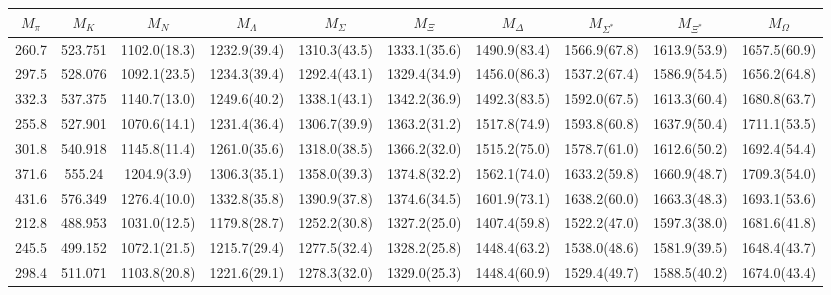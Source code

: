 \documentclass[10pt,a4paper]{article}
\begin{document}
		
			
			\begin{table}[h!]\small
				\begin{tabular}{cccccccccc}
					$M_{\pi}$ & $M_K$ & $M_N$ & $M_{\Lambda}$ & $M_{\Sigma}$ & $M_{\Xi}$ & $M_{\Delta}$ & $M_{\Sigma^*}$ & $M_{\Xi^*}$ & $M_{\Omega}$ \\ 
					\hline 260.7 & 523.751  & 1102.0(18.3) & 1232.9(39.4) & 1310.3(43.5) & 1333.1(35.6) & 1490.9(83.4) & 1566.9(67.8) & 1613.9(53.9) & 1657.5(60.9) \\ 
					297.5 & 528.076 & 1092.1(23.5) & 1234.3(39.4) & 1292.4(43.1) & 1329.4(34.9) & 1456.0(86.3) & 1537.2(67.4) & 1586.9(54.5) & 1656.2(64.8) \\ 
					332.3 & 537.375 & 1140.7(13.0) & 1249.6(40.2) & 1338.1(43.1) & 1342.2(36.9) & 1492.3(83.5) & 1592.0(67.5) & 1613.3(60.4) & 1680.8(63.7) \\ 
					\hline 255.8 & 527.901 & 1070.6(14.1) & 1231.4(36.4) & 1306.7(39.9) & 1363.2(31.2) & 1517.8(74.9) & 1593.8(60.8) & 1637.9(50.4) & 1711.1(53.5) \\ 
					301.8 & 540.918 & 1145.8(11.4) & 1261.0(35.6) & 1318.0(38.5) & 1366.2(32.0) & 1515.2(75.0) & 1578.7(61.0) & 1612.6(50.2) & 1692.4(54.4) \\ 
					371.6 & 555.24 & 1204.9(3.9) & 1306.3(35.1) & 1358.0(39.3) & 1374.8(32.2) & 1562.1(74.0) & 1633.2(59.8) & 1660.9(48.7) & 1709.3(54.0) \\ 
					431.6 & 576.349 & 1276.4(10.0) & 1332.8(35.8) & 1390.9(37.8) & 1374.6(34.5) & 1601.9(73.1) & 1638.2(60.0) & 1663.3(48.3) & 1693.1(53.6) \\ 
					\hline 212.8 & 488.953 & 1031.0(12.5) & 1179.8(28.7) & 1252.2(30.8) & 1327.2(25.0) & 1407.4(59.8) & 1522.2(47.0) & 1597.3(38.0) & 1681.6(41.8) \\ 
					245.5 & 499.152 & 1072.1(21.5) & 1215.7(29.4) & 1277.5(32.4) & 1328.2(25.8) & 1448.4(63.2) & 1538.0(48.6) & 1581.9(39.5) & 1648.4(43.7) \\ 
					298.4 & 511.071 & 1103.8(20.8) & 1221.6(29.1) & 1278.3(32.0) & 1329.0(25.3) & 1448.4(60.9) & 1529.4(49.7) & 1588.5(40.2) & 1674.0(43.4)\\
					\hline
					\end{tabular} 
					\end{table}
					
\end{document}
